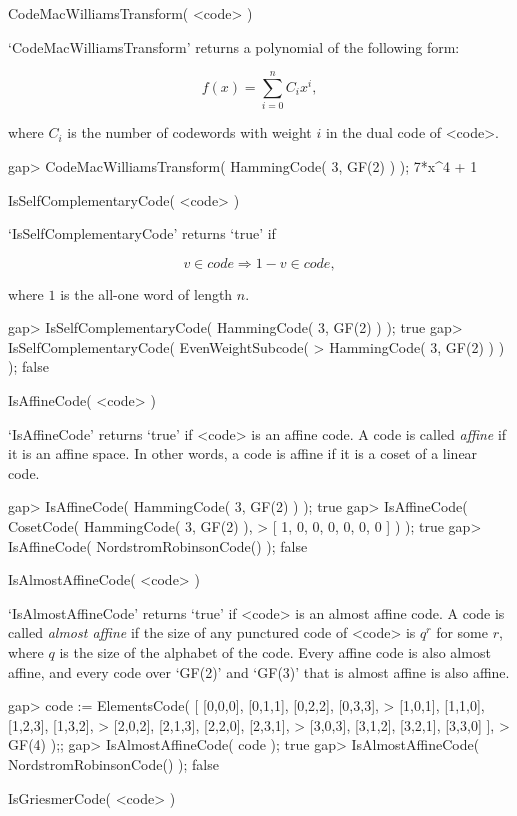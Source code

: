 \>CodeMacWilliamsTransform( <code> )

`CodeMacWilliamsTransform' returns a polynomial of the following form:

$$
f(x) = \sum_{i=0}^{n} C_i x^i,
$$

where $C_i$ is the number of codewords with weight $i$ in the dual code
of <code>.

\beginexample
gap> CodeMacWilliamsTransform( HammingCode( 3, GF(2) ) );
7*x^4 + 1 
\endexample

\>IsSelfComplementaryCode( <code> )

`IsSelfComplementaryCode' returns `true' if

$$
v \in code \Rightarrow 1 - v \in code,
$$

where $1$ is the all-one word of length $n$.

\beginexample
gap> IsSelfComplementaryCode( HammingCode( 3, GF(2) ) );
true
gap> IsSelfComplementaryCode( EvenWeightSubcode(
> HammingCode( 3, GF(2) ) ) );
false 
\endexample

\>IsAffineCode( <code> )

`IsAffineCode' returns `true' if <code> is an affine code.
A code is called {\it affine} if it is an affine space.
In other words, a code is affine if it is a coset of a linear code.

\beginexample
gap> IsAffineCode( HammingCode( 3, GF(2) ) );
true
gap> IsAffineCode( CosetCode( HammingCode( 3, GF(2) ),
> [ 1, 0, 0, 0, 0, 0, 0 ] ) );
true
gap> IsAffineCode( NordstromRobinsonCode() );
false 
\endexample

\>IsAlmostAffineCode( <code> )

`IsAlmostAffineCode' returns `true' if <code> is an almost affine code.
A code is called {\it almost affine} if the size of any punctured code
of <code> is $q^r$ for some $r$, where $q$ is the size of the alphabet
of the code.
Every affine code is also almost affine, and every code over `GF(2)'
and `GF(3)' that is almost affine is also affine.

\beginexample
gap> code := ElementsCode( [ [0,0,0], [0,1,1], [0,2,2], [0,3,3],
>                             [1,0,1], [1,1,0], [1,2,3], [1,3,2],
>                             [2,0,2], [2,1,3], [2,2,0], [2,3,1],
>                             [3,0,3], [3,1,2], [3,2,1], [3,3,0] ],
>                             GF(4) );;
gap> IsAlmostAffineCode( code );
true
gap> IsAlmostAffineCode( NordstromRobinsonCode() );
false 
\endexample

\>IsGriesmerCode( <code> )

